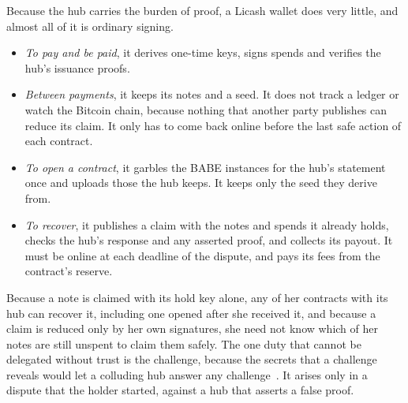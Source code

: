 \documentclass[11pt]{article}
\makeatletter
\renewcommand\section{\@startsection{section}{1}{\z@}{-2.5ex plus -1ex minus -.2ex}{1.2ex plus .2ex}{\large\bfseries}}
\makeatother
\begin{document}
Because the hub carries the burden of proof, a Licash wallet does very little, and almost all of it is ordinary signing.
\begin{itemize}[leftmargin=1.5em, itemsep=0pt]
\item \emph{To pay and be paid}, it derives one-time keys, signs spends and verifies the hub's issuance proofs.
\item \emph{Between payments}, it keeps its notes and a seed. It does not track a ledger or watch the Bitcoin chain, because nothing that another party publishes can reduce its claim. It only has to come back online before the last safe action of each contract.
\item \emph{To open a contract}, it garbles the BABE instances for the hub's statement once and uploads those the hub keeps. It keeps only the seed they derive from.
\item \emph{To recover}, it publishes a claim with the notes and spends it already holds, checks the hub's response and any asserted proof, and collects its payout. It must be online at each deadline of the dispute, and pays its fees from the contract's reserve.
\end{itemize}
Because a note is claimed with its hold key alone, any of her contracts with its hub can recover it, including one opened after she received it, and because a claim is reduced only by her own signatures, she need not know which of her notes are still unspent to claim them safely. The one duty that cannot be delegated without trust is the challenge, because the secrets that a challenge reveals would let a colluding hub answer any challenge~\cite[App.~A]{lichen}. It arises only in a dispute that the holder started, against a hub that asserts a false proof.

\section{Security}
\label{sec:security}
\end{document}
